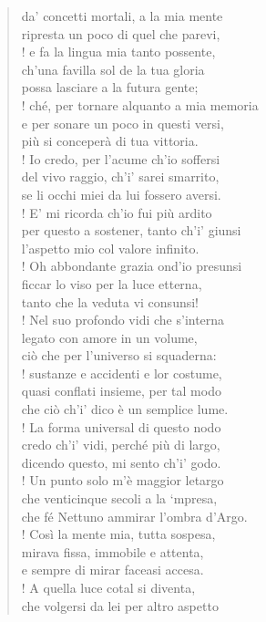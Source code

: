 \documentclass[a4paper, twoside, titlepage]{book}
\newcounter{mar}
\begin{document}
\begin{verse}
da’ concetti mortali, a la mia mente\\
ripresta un poco di quel che parevi,\\!
e fa la lingua mia tanto possente,\\
ch’una favilla sol de la tua gloria\\
possa lasciare a la futura gente;\\!
ché, per tornare alquanto a mia memoria\\
e per sonare un poco in questi versi,\\
più si conceperà di tua vittoria.\\!
Io credo, per l’acume ch’io soffersi\\
del vivo raggio, ch’i’ sarei smarrito,\\
se li occhi miei da lui fossero aversi.\\!
E’ mi ricorda ch’io fui più ardito\\
per questo a sostener, tanto ch’i’ giunsi\\
l’aspetto mio col valore infinito.\\!
Oh abbondante grazia ond’io presunsi\\
ficcar lo viso per la luce etterna,\\
tanto che la veduta vi consunsi!\\!
Nel suo profondo vidi che s’interna\\
legato con amore in un volume,\\
ciò che per l’universo si squaderna:\\!
sustanze e accidenti e lor costume,\\
quasi conflati insieme, per tal modo\\
che ciò ch’i’ dico è un semplice lume.\\!
La forma universal di questo nodo\\
credo ch’i’ vidi, perché più di largo,\\
dicendo questo, mi sento ch’i’ godo.\\!
Un punto solo m’è maggior letargo\\
che venticinque secoli a la ‘mpresa,\\
che fé Nettuno ammirar l’ombra d’Argo.\\!
Così la mente mia, tutta sospesa,\\
mirava fissa, immobile e attenta,\\
e sempre di mirar faceasi accesa.\\!
A quella luce cotal si diventa,\\
che volgersi da lei per altro aspetto\\

\end{verse}
\end{document}
